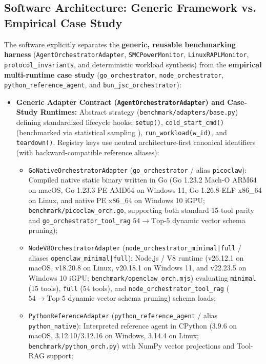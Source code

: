 \documentclass[11pt,a4paper]{article}
\begin{document}
\subsection{Software Architecture: Generic Framework vs. Empirical Case Study}
The software explicitly separates the \textbf{generic, reusable benchmarking harness} (\texttt{AgentOrchestratorAdapter}, \texttt{SMCPowerMonitor}, \texttt{LinuxRAPLMonitor}, \texttt{protocol\_invariants}, and deterministic workload synthesis) from the \textbf{empirical multi-runtime case study} (\texttt{go\_orchestrator}, \texttt{node\_orchestrator}, \texttt{python\_reference\_agent}, and \texttt{bun\_jsc\_orchestrator}):
\begin{itemize}
    \item \textbf{Generic Adapter Contract (\texttt{AgentOrchestratorAdapter}) and Case-Study Runtimes:} Abstract strategy (\texttt{benchmark/adapters/base.py}) defining standardized lifecycle hooks: \texttt{setup()}, \texttt{cold\_start\_cmd()} (benchmarked via statistical sampling \cite{kalibera2013rigorous}), \texttt{run\_workload(w\_id)}, and \texttt{teardown()}. Registry keys use neutral architecture-first canonical identifiers (with backward-compatible reference aliases):
    \begin{itemize}
        \item \texttt{GoNativeOrchestratorAdapter} (\texttt{go\_orchestrator} / alias \texttt{picoclaw}): Compiled native static binary written in Go (Go 1.23.2 Mach-O ARM64 on macOS, Go 1.23.3 PE AMD64 on Windows 11, Go 1.26.8 ELF x86\_64 on Linux, and native PE x86\_64 on Windows 10 iGPU; \texttt{benchmark/picoclaw\_orch.go}, supporting both standard 15-tool parity and \texttt{go\_orchestrator\_tool\_rag} $54 \rightarrow \text{Top-}5$ dynamic vector schema pruning);
        \item \texttt{NodeV8OrchestratorAdapter} (\texttt{node\_orchestrator\_minimal|full} / aliases \texttt{openclaw\_minimal|full}): Node.js / V8 runtime (v26.12.1 on macOS, v18.20.8 on Linux, v20.18.1 on Windows 11, and v22.23.5 on Windows 10 iGPU; \texttt{benchmark/openclaw\_orch.mjs}) evaluating \texttt{minimal} (15 tools), \texttt{full} (54 tools), and \texttt{node\_orchestrator\_tool\_rag} ($54 \rightarrow \text{Top-}5$ dynamic vector schema pruning) schema loads;
        \item \texttt{PythonReferenceAdapter} (\texttt{python\_reference\_agent} / alias \texttt{python\_native}): Interpreted reference agent in CPython (3.9.6 on macOS, 3.12.10/3.12.16 on Windows, 3.14.4 on Linux; \texttt{benchmark/python\_orch.py}) with NumPy vector projections and Tool-RAG support;

\end{itemize}
\end{itemize}
\end{document}
